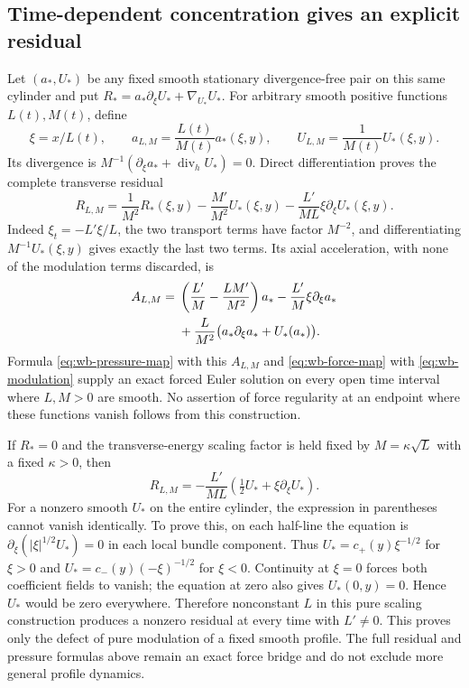 \subsection{Time-dependent concentration gives an explicit residual}
Let $(a_*,U_*)$ be any fixed smooth stationary divergence-free pair
on this same cylinder and put
$R_*=a_*\partial_\xi U_*+\nabla_{U_*}U_*$.
For arbitrary smooth positive functions $L(t),M(t)$, define
\[
 \xi=x/L(t),\qquad
 a_{L,M}=\frac{L(t)}{M(t)}a_*(\xi,y),\qquad
 U_{L,M}=\frac1{M(t)}U_*(\xi,y).
\]
Its divergence is $M^{-1}(\partial_\xi a_*+
\operatorname{div}_hU_*)=0$. Direct differentiation proves the
complete transverse residual
\begin{equation}\label{eq:wb-modulation}
 R_{L,M}=\frac1{M^2}R_*(\xi,y)
 -\frac{M'}{M^2}U_*(\xi,y)
 -\frac{L'}{ML}\xi\partial_\xi U_*(\xi,y).
\end{equation}
Indeed $\xi_t=-L'\xi/L$, the two transport terms have factor $M^{-2}$,
and differentiating $M^{-1}U_*(\xi,y)$ gives exactly the last two
terms. Its axial acceleration, with none of the modulation terms
discarded, is
\begin{align}
 A_{L,M}={}&\left(\frac{L'}M-\frac{LM'}{M^2}\right)a_*
 -\frac{L'}M\xi\partial_\xi a_*\notag\\
 &+\frac L{M^2}\bigl(a_*\partial_\xi a_*+U_*(a_*)\bigr).
 \label{eq:wb-modulation-axial}
\end{align}
Formula \eqref{eq:wb-pressure-map} with this $A_{L,M}$ and
\eqref{eq:wb-force-map} with \eqref{eq:wb-modulation} supply an
exact forced Euler solution on every open time interval where
$L,M>0$ are smooth. No assertion of force regularity at an endpoint
where these functions vanish follows from this construction.

If $R_*=0$ and the transverse-energy scaling factor is held fixed by
$M=\kappa\sqrt L$ with a fixed $\kappa>0$, then
\begin{equation}\label{eq:wb-energy-modulation-defect}
 R_{L,M}=-\frac{L'}{ML}
 \left(\tfrac12U_*+\xi\partial_\xi U_*\right).
\end{equation}
For a nonzero smooth $U_*$ on the entire cylinder, the expression
in parentheses cannot vanish identically. To prove this, on each
half-line the equation is
$\partial_\xi(|\xi|^{1/2}U_*)=0$ in each local bundle component.
Thus $U_*=c_+(y)\xi^{-1/2}$ for $\xi>0$ and
$U_*=c_-(y)(-\xi)^{-1/2}$ for $\xi<0$. Continuity at $\xi=0$
forces both coefficient fields to vanish; the equation at zero also
gives $U_*(0,y)=0$. Hence $U_*$ would be zero everywhere.
Therefore nonconstant $L$ in this pure scaling construction produces
a nonzero residual at every time with $L'\ne0$. This proves only
the defect of pure modulation of a fixed smooth profile. The full
residual and pressure formulas above remain an exact force bridge
and do not exclude more general profile dynamics.

